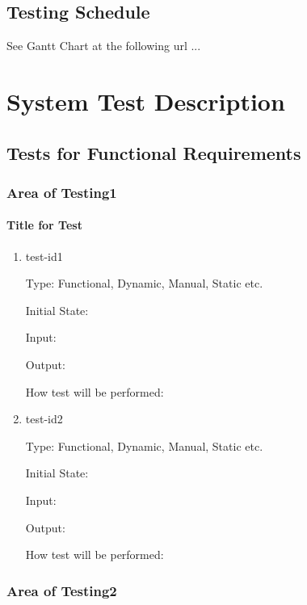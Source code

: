 \documentclass[12pt, titlepage]{article}
\begin{document}
\subsection{Testing Schedule}
		
See Gantt Chart at the following url ...

\section{System Test Description}
	
\subsection{Tests for Functional Requirements}

\subsubsection{Area of Testing1}
		
\paragraph{Title for Test}

\begin{enumerate}

\item{test-id1\\}

Type: Functional, Dynamic, Manual, Static etc.
					
Initial State: 
					
Input: 
					
Output: 
					
How test will be performed: 
					
\item{test-id2\\}

Type: Functional, Dynamic, Manual, Static etc.
					
Initial State: 
					
Input: 
					
Output: 
					
How test will be performed: 

\end{enumerate}

\subsubsection{Area of Testing2}
\end{document}
